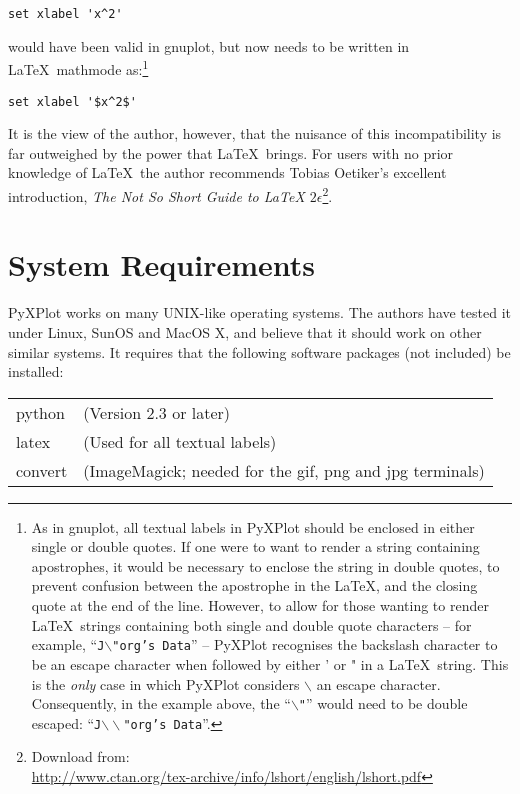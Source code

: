 \documentclass[a4paper,onecolumn,11pt]{book}
\begin{document}
\begin{verbatim}set xlabel 'x^2'\end{verbatim}

\noindent would have been valid in gnuplot, but now needs to be written in
\LaTeX\ mathmode as:\footnote{As in gnuplot, all textual labels in PyXPlot %
should be enclosed in either single or double quotes. If one were to want to
render a string containing apostrophes, it would be necessary to enclose the
string in double quotes, to prevent confusion between the apostrophe in the
\LaTeX, and the closing quote at the end of the line. However, to allow for
those wanting to render \LaTeX\ strings containing both single and double quote
characters -- for example, ``\texttt{J$\backslash$"org's Data}'' -- PyXPlot
recognises the backslash character to be an escape character when followed by
either ' or " in a \LaTeX\ string. This is the \textit{only} case in which
PyXPlot considers $\backslash$ an escape character. Consequently, in the
example above, the ``\texttt{$\backslash$"}'' would need to be double escaped:
``\texttt{J$\backslash\backslash$"org's Data}''.}

\begin{verbatim}set xlabel '$x^2$'\end{verbatim}

\noindent It is the view of the author, however, that the nuisance of this
incompatibility is far outweighed by the power that \LaTeX\ brings. For users
with no prior knowledge of \LaTeX\ the author recommends Tobias Oetiker's
excellent introduction, \textit{The Not So Short Guide to \LaTeX
$2\epsilon$}\footnote{Download from:\\
\url{http://www.ctan.org/tex-archive/info/lshort/english/lshort.pdf}}.

\section{System Requirements}

PyXPlot works on many UNIX-like operating systems. The authors have tested it
under Linux, SunOS and MacOS X, and believe that it should work on other
similar systems. It requires that the following software packages (not
included) be installed:

\vspace{0.5cm}
\begin{tabular}{ll}
python  & (Version 2.3 or later) \\
latex   & (Used for all textual labels) \\
convert & (ImageMagick; needed for the gif, png and jpg terminals) \\
\end{tabular}
\vspace{0.5cm}
\end{document}
